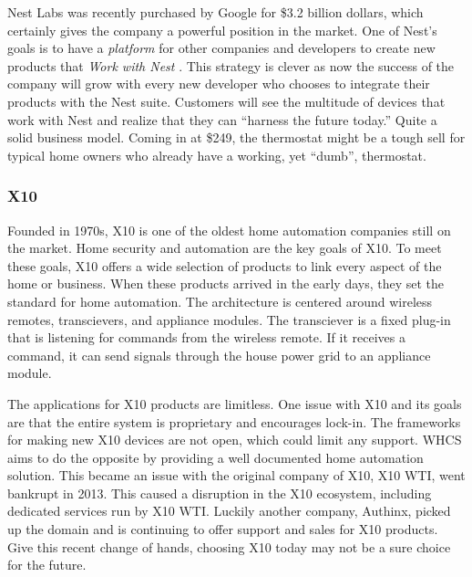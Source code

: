 Nest Labs was recently purchased by Google for \$3.2 billion dollars\cite{link20},
which certainly gives the company a powerful position in the market. One of
Nest's goals is to have a \emph{platform} for other companies and developers to
create new products that \emph{Work with Nest \texttrademark}\cite{link21}. This strategy is
clever as now the success of the company will grow with every new
developer who chooses to integrate their products with the Nest suite.
Customers will see the multitude of devices that work with Nest and realize
that they can ``harness the future today.'' Quite a solid business model.
Coming in at \$249, the thermostat might be a tough sell for typical home owners who
already have a working, yet ``dumb'', thermostat.

\subsubsection{X10}
Founded in 1970s, X10 is one of the oldest home automation companies still on
the market.  Home security and automation are the key goals of X10. To meet
these goals, X10 offers a wide selection of products to link every aspect of
the home or business. When these products arrived in the early days, they set
the standard for home automation. The architecture is centered around wireless
remotes, transcievers, and appliance modules.  The transciever is a fixed
plug-in that is listening for commands from the wireless remote. If it receives
a command, it can send signals through the house power grid to an appliance
module.

The applications for X10 products are limitless. One issue with X10 and its
goals are that the entire system is proprietary and encourages lock-in. The
frameworks for making new X10 devices are not open, which could limit any
support. WHCS aims to do the opposite by providing a well documented home automation solution.
This became an issue with the original company of X10, X10 WTI, went
bankrupt in 2013. This caused a disruption in the X10 ecosystem, including
dedicated services run by X10 WTI. Luckily another company, Authinx, picked up
the domain\cite{link1} and is continuing to offer support and sales for
X10 products. Give this recent change of hands, choosing X10 today may not be a
sure choice for the future.
